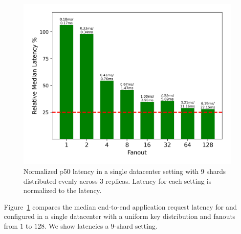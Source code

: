 
\begin{figure}[tbp]
\centering
  \includegraphics[width=.9\linewidth]{figs/multicore/relative_latencies_multicore.png}
\caption{Normalized p50 latency in a single datacenter setting with 9 shards distributed evenly across 3 replicas. Latency for each setting is normalized to the \mpaxos{} latency.}
\label{fig:DC}
\end{figure}

Figure~\ref{fig:DC} compares the median
end-to-end application request latency for \system{} and \mpaxos{}
configured in a single datacenter with a uniform key distribution and fanouts from $1$ to $128$. We show latencies a 9-shard setting.

